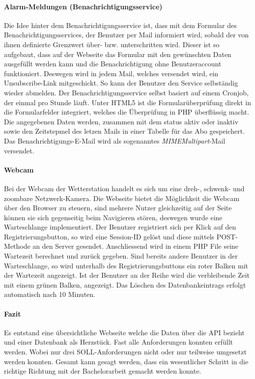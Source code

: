 \documentclass[10pt]{article}
\begin{document}
\begin{multicols}{2}
\paragraph{Alarm-Meldungen (Benachrichtigungsservice)}
Die Idee hinter dem Benachrichtigungsservice ist, dass mit dem  Formular des Benachrichtigungsservices, der Benutzer per Mail informiert wird, sobald der von ihnen definierte Grenzwert über- bzw. unterschritten wird.  Dieser ist so aufgebaut, dass auf der Webseite das Formular mit den gewünschten Daten ausgefüllt werden kann und die Benachrichtigung ohne Benutzeraccount funktioniert. Deswegen wird in jedem Mail, welches versendet wird, ein Unsubscribe-Link mitgeschickt. So kann der Benutzer den Service selbständig wieder abmelden. Der Benachrichtigungsservice selbst basiert auf einem Cronjob, der einmal pro Stunde läuft. Unter HTML5 ist die Formularüberprüfung direkt in die Formularfelder integriert, welches die Überprüfung in PHP überflüssig macht. Die angegebenen Daten werden, zusammen mit dem status aktiv oder inaktiv sowie den Zeitstepmel des letzen Mails in einer Tabelle für das Abo gespeichert. Das Benachrichtigungs-E-Mail wird als sogenanntes \emph{MIMEMultipart}-Mail versendet.

\paragraph{Webcam}
Bei der Webcam der Wetterstation handelt es sich um eine dreh-, schwenk- und zoombare Netzwerk-Kamera. Die Webseite bietet die Möglichkeit die Webcam über den Browser zu steuern, sind mehrere Nutzer gleichzeitig auf der Seite können sie sich gegenseitig beim Navigieren stören, deswegen wurde eine Warteschlange implementiert. Der Benutzer registriert sich per Klick auf den Registrierungsbutton, so wird eine Session-ID gelöst und diese mittels POST-Methode an den Server gesendet. Anschliessend wird in einem PHP File seine Wartezeit berechnet und zurück gegeben. Sind bereits andere Benutzer in der Warteschlange, so wird unterhalb des Registrierungsbuttons ein roter Balken mit der Wartezeit angezeigt. Ist der Benutzer an der Reihe wird die verbleibende Zeit mit einem grünen Balken, angezeigt. Das Löschen des Datenbankeintrags erfolgt automatisch nach 10 Minuten.
\paragraph{Fazit}
Es entstand eine übersichtliche Webseite welche die Daten über die API bezieht und einer Datenbank als Herzstück. Fast alle Anforderungen konnten erfüllt werden. Wobei nur drei SOLL-Anforderungen nicht  oder nur teilweise umgesetzt werden konnten. Gesamt kann gesagt werden, dass ein wesentlicher Schritt in die richtige Richtung mit der Bachelorarbeit gemacht werden konnte.
\end{multicols}
 
\end{document}
